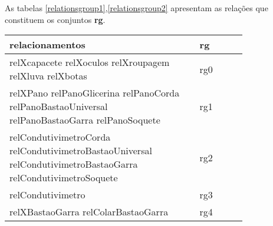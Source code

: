 As tabelas \ref{relationsgroup1},\ref{relationsgroup2} apresentam as relações que constituem os conjuntos \textbf{rg}.
\begin{table}[H]
\centering
{}
\begin{tabular}{|p{0.8\linewidth}|l|}
\hline
\textbf{relacionamentos}                                                                                                                                                                                                                                                                                                                  & \textbf{rg} \\ \hline
relXcapacete relXoculos relXroupagem relXluva relXbotas                                                                                                                                                                                                                                                                                   & rg0         \\ \hline
relXPano relPanoGlicerina relPanoCorda relPanoBastaoUniversal relPanoBastaoGarra relPanoSoquete                                                                                                                                                                                                                                           & rg1         \\ \hline
relCondutivimetroCorda relCondutivimetroBastaoUniversal relCondutivimetroBastaoGarra relCondutivimetroSoquete                                                                                                                                                                                                                                & rg2         \\ \hline
relCondutivimetro                                                                                                                                                                                                                                                                                                                         & rg3         \\ \hline
relXBastaoGarra relColarBastaoGarra                                                                                                                                                                                                                                                                                                        & rg4         \\ \hline

\end{tabular}
\end{table}
